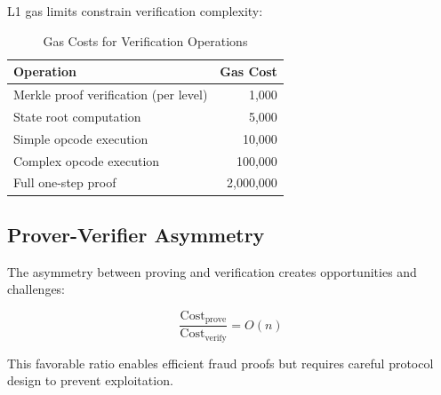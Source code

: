 L1 gas limits constrain verification complexity:

\begin{table}[h]
\centering
\caption{Gas Costs for Verification Operations}
\begin{tabular}{lr}
\toprule
\textbf{Operation} & \textbf{Gas Cost} \\
\midrule
Merkle proof verification (per level) & 1,000 \\
State root computation & 5,000 \\
Simple opcode execution & 10,000 \\
Complex opcode execution & 100,000 \\
Full one-step proof & 2,000,000 \\
\bottomrule
\end{tabular}
\end{table}

\subsection{Prover-Verifier Asymmetry}

The asymmetry between proving and verification creates opportunities and challenges:

\begin{equation}
\frac{\text{Cost}_{\text{prove}}}{\text{Cost}_{\text{verify}}} = O(n)
\end{equation}

This favorable ratio enables efficient fraud proofs but requires careful protocol design to prevent exploitation.

